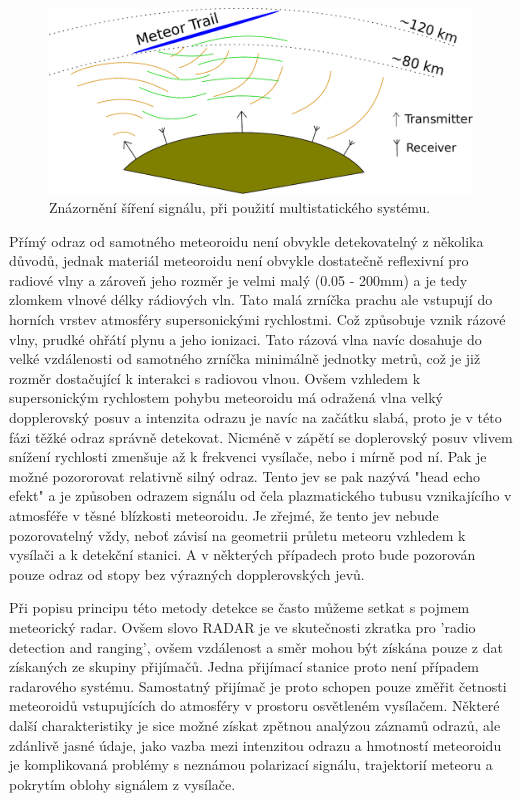 \documentclass[12pt,a4paper,oneside]{article}
\begin{document}
\begin{figure} [htbp]
\centering
\includegraphics [width=120mm] {./img/Meteor_detection.pdf} 
\caption{Znázornění šíření signálu, při použití multistatického systému.}
\end{figure}

Přímý odraz od samotného meteoroidu není obvykle detekovatelný z několika důvodů, jednak materiál meteoroidu není obvykle dostatečně reflexivní pro radiové vlny a zároveň jeho rozměr je velmi malý (0.05 - 200mm) a je tedy zlomkem vlnové délky rádiových vln. Tato malá zrníčka prachu ale vstupují do horních vrstev atmosféry supersonickými rychlostmi. Což způsobuje vznik rázové vlny, prudké ohřátí plynu a jeho ionizaci. Tato rázová vlna navíc dosahuje do velké vzdálenosti od samotného zrníčka minimálně jednotky metrů, což je již rozměr dostačující k interakci s radiovou vlnou. Ovšem vzhledem k supersonickým rychlostem pohybu meteoroidu má odražená vlna velký dopplerovský posuv a intenzita odrazu je navíc na začátku slabá, proto je v této fázi těžké odraz správně detekovat. Nicméně v zápětí se doplerovský posuv vlivem snížení rychlosti zmenšuje až k frekvenci vysílače, nebo i mírně pod ní. Pak je možné pozororovat relativně silný odraz. Tento jev se pak nazývá "head echo efekt" a je způsoben odrazem signálu od čela plazmatického tubusu vznikajícího v atmosféře v těsné blízkosti meteoroidu. Je zřejmé, že tento jev nebude pozorovatelný  vždy, neboť závisí na geometrii průletu meteoru vzhledem k vysílači a k detekční stanici. A v některých případech proto bude pozorován pouze odraz od stopy bez výrazných dopplerovských jevů. 

Při popisu principu této metody detekce se často můžeme setkat s pojmem meteorický radar.  Ovšem slovo RADAR je ve skutečnosti zkratka pro 'radio detection and ranging', ovšem vzdálenost a směr mohou být získána pouze z dat získaných ze skupiny přijímačů. Jedna přijímací stanice proto není případem radarového systému.  Samostatný přijímač je proto schopen pouze změřit četnosti meteoroidů vstupujících do atmosféry v prostoru osvětleném vysílačem. Některé další charakteristiky je sice možné získat zpětnou analýzou záznamů odrazů, ale zdánlivě jasné údaje, jako vazba mezi intenzitou odrazu a hmotností meteoroidu je komplikovaná problémy s neznámou polarizací signálu, trajektorií meteoru a pokrytím oblohy signálem z vysílače.
    
\end{document}
